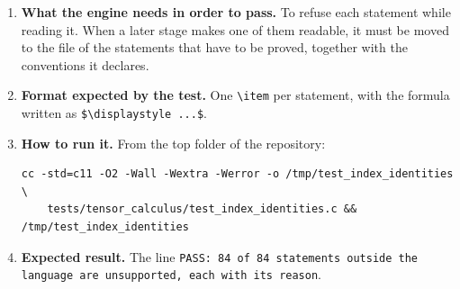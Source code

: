 \documentclass[11pt,a4paper]{article}
\begin{document}
\begin{enumerate}
\item \textbf{What the engine needs in order to pass.} To refuse each statement while reading it. When a later stage makes one of them readable, it must be moved to the file of the statements that have to be proved, together with the conventions it declares.

\item \textbf{Format expected by the test.} One \texttt{\textbackslash item} per statement, with the formula written as \texttt{\$\textbackslash displaystyle ...\$}.

\item \textbf{How to run it.} From the top folder of the repository:
\begin{verbatim}
cc -std=c11 -O2 -Wall -Wextra -Werror -o /tmp/test_index_identities \
    tests/tensor_calculus/test_index_identities.c && /tmp/test_index_identities
\end{verbatim}

\item \textbf{Expected result.} The line \texttt{PASS: 84 of 84 statements outside the language are unsupported, each with its reason}.
\end{enumerate}
\end{document}
